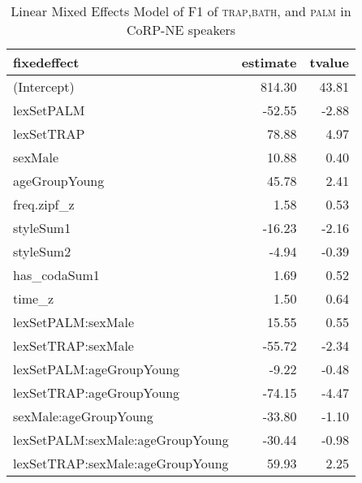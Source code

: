 \begin{table}[ht]
\centering
\begin{tabular}{lrr}
  \hline
fixedeffect & estimate & tvalue \\ 
  \hline
(Intercept) & 814.30 & 43.81 \\ 
  lexSetPALM & -52.55 & -2.88 \\ 
  lexSetTRAP & 78.88 & 4.97 \\ 
  sexMale & 10.88 & 0.40 \\ 
  ageGroupYoung & 45.78 & 2.41 \\ 
  freq.zipf\_z & 1.58 & 0.53 \\ 
  styleSum1 & -16.23 & -2.16 \\ 
  styleSum2 & -4.94 & -0.39 \\ 
  has\_codaSum1 & 1.69 & 0.52 \\ 
  time\_z & 1.50 & 0.64 \\ 
  lexSetPALM:sexMale & 15.55 & 0.55 \\ 
  lexSetTRAP:sexMale & -55.72 & -2.34 \\ 
  lexSetPALM:ageGroupYoung & -9.22 & -0.48 \\ 
  lexSetTRAP:ageGroupYoung & -74.15 & -4.47 \\ 
  sexMale:ageGroupYoung & -33.80 & -1.10 \\ 
  lexSetPALM:sexMale:ageGroupYoung & -30.44 & -0.98 \\ 
  lexSetTRAP:sexMale:ageGroupYoung & 59.93 & 2.25 \\ 
   \hline
\end{tabular}
\caption{Linear Mixed Effects Model of F1 of \textsc{trap},\textsc{bath}, and \textsc{palm} in CoRP-NE speakers \label{tbl:TBPF1NE}} 
\end{table}
